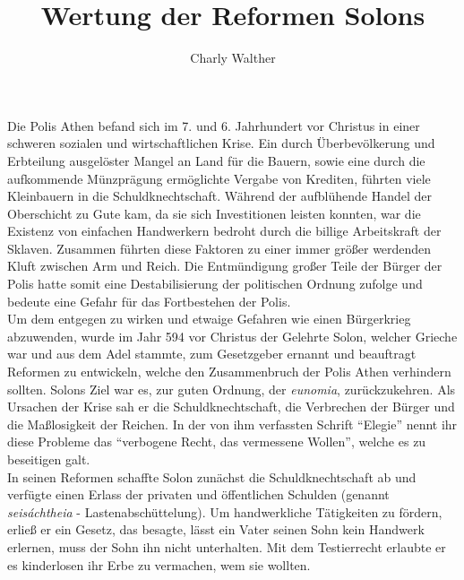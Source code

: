 \documentclass{article}
\title{Wertung der Reformen Solons}
\author{Charly Walther}
\begin{document}
   \maketitle

                      
Die Polis Athen befand sich im 7. und 6. Jahrhundert vor Christus in einer schweren sozialen und wirtschaftlichen Krise. Ein durch Überbevölkerung und Erbteilung ausgelöster Mangel an Land für die Bauern, sowie eine durch die aufkommende Münzprägung ermöglichte Vergabe von Krediten, führten viele Kleinbauern in die Schuldknechtschaft. Während der aufblühende Handel der Oberschicht zu Gute kam, da sie sich Investitionen leisten konnten, war die Existenz von einfachen Handwerkern bedroht durch die billige Arbeitskraft der Sklaven. Zusammen führten diese Faktoren zu einer immer größer werdenden Kluft zwischen Arm und Reich. Die Entmündigung großer Teile der Bürger der Polis hatte somit eine Destabilisierung der politischen Ordnung zufolge und bedeute eine Gefahr für das Fortbestehen der Polis.  \\
Um dem entgegen zu wirken und etwaige Gefahren wie einen Bürgerkrieg abzuwenden, wurde im Jahr 594 vor Christus der Gelehrte Solon, welcher Grieche war und aus dem Adel stammte, zum Gesetzgeber ernannt und beauftragt Reformen zu entwickeln, welche den Zusammenbruch der Polis Athen verhindern sollten. Solons Ziel war es, zur guten Ordnung, der \textit{eunomia}, zurückzukehren. Als Ursachen der Krise sah er die Schuldknechtschaft, die Verbrechen der Bürger und die Maßlosigkeit der Reichen. In der von ihm verfassten Schrift "`Elegie"' nennt ihr diese Probleme das "`verbogene Recht, das vermessene Wollen"', welche es zu beseitigen galt. \\
In seinen Reformen schaffte Solon zunächst die Schuldknechtschaft ab und verfügte einen Erlass der privaten und öffentlichen Schulden (genannt \textit{seisáchtheia} - Lastenabschüttelung). Um handwerkliche Tätigkeiten zu fördern, erließ er ein Gesetz, das besagte, lässt ein Vater seinen Sohn kein Handwerk erlernen, muss der Sohn ihn nicht unterhalten. Mit dem Testierrecht erlaubte er es kinderlosen ihr Erbe zu vermachen, wem sie wollten.  \\
\end{document}
